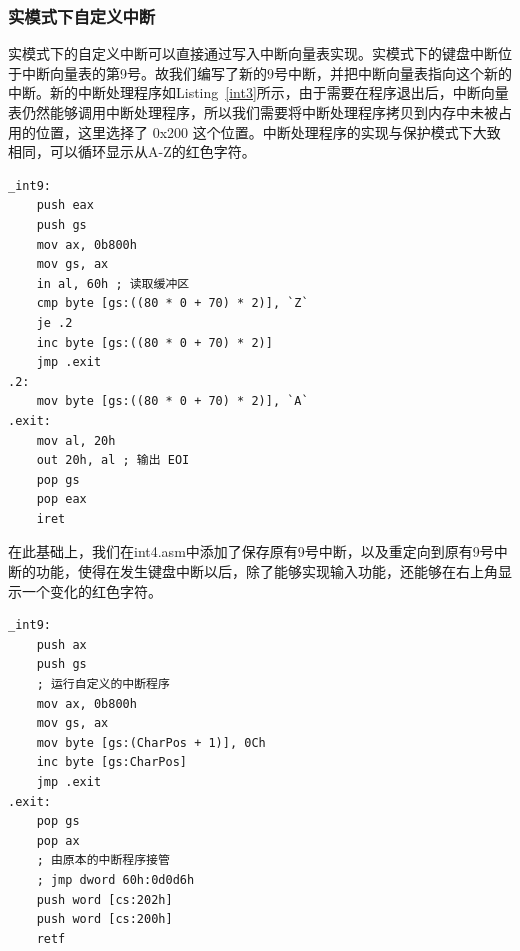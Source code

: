 \documentclass[UTF8,12pt]{ctexart}
\begin{document}
    
    \subsubsection{实模式下自定义中断}

    实模式下的自定义中断可以直接通过写入中断向量表实现。实模式下的键盘中断位于中断向量表的第9号。故我们编写了新的9号中断，并把中断向量表指向这个新的中断。新的中断处理程序如Listing~\ref{int3}所示，由于需要在程序退出后，中断向量表仍然能够调用中断处理程序，所以我们需要将中断处理程序拷贝到内存中未被占用的位置，这里选择了 0x200 这个位置。中断处理程序的实现与保护模式下大致相同，可以循环显示从A-Z的红色字符。
    
    \begin{lstlisting}[language={[x86masm]Assembler}, caption={int3.asm}, label={int3}]
    _int9:
    push eax
    push gs
    mov ax, 0b800h
    mov gs, ax
    in al, 60h ; 读取缓冲区
    cmp byte [gs:((80 * 0 + 70) * 2)], `Z`
    je .2
    inc byte [gs:((80 * 0 + 70) * 2)]
    jmp .exit
.2:
    mov byte [gs:((80 * 0 + 70) * 2)], `A`
.exit:
    mov al, 20h
    out 20h, al ; 输出 EOI
    pop gs
    pop eax
    iret
    \end{lstlisting}
    
    在此基础上，我们在int4.asm中添加了保存原有9号中断，以及重定向到原有9号中断的功能，使得在发生键盘中断以后，除了能够实现输入功能，还能够在右上角显示一个变化的红色字符。
    
    \begin{lstlisting}
_int9:
    push ax
    push gs
    ; 运行自定义的中断程序
    mov ax, 0b800h
    mov gs, ax
    mov byte [gs:(CharPos + 1)], 0Ch
    inc byte [gs:CharPos]
    jmp .exit
.exit:
    pop gs
    pop ax
    ; 由原本的中断程序接管
    ; jmp dword 60h:0d0d6h
    push word [cs:202h]
    push word [cs:200h]
    retf
    \end{lstlisting}
    
\end{document}
